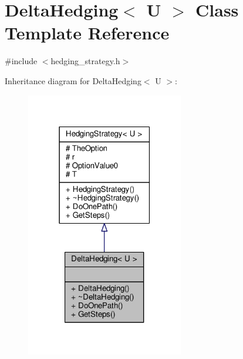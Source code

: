 \hypertarget{classDeltaHedging}{}\section{Delta\+Hedging$<$ U $>$ Class Template Reference}
\label{classDeltaHedging}


{\ttfamily \#include $<$hedging\+\_\+strategy.\+h$>$}



Inheritance diagram for Delta\+Hedging$<$ U $>$\+:
\nopagebreak
\begin{figure}[H]
\begin{center}
\leavevmode
\includegraphics[width=195pt]{classDeltaHedging__inherit__graph}
\end{center}
\end{figure}


